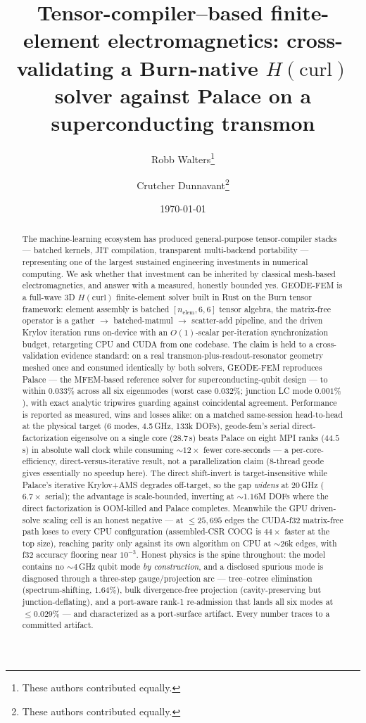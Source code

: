\documentclass{anvil-paper}
\title{Tensor-compiler--based finite-element electromagnetics:
cross-validating a Burn-native $H(\mathrm{curl})$ solver against Palace on
a superconducting transmon}
\author{Robb Walters\thanks{These authors contributed equally.}
  \and Crutcher Dunnavant\thanks{These authors contributed equally.}}
\date{\today}
\begin{document}
\maketitle

\begin{abstract}
The machine-learning ecosystem has produced general-purpose tensor-compiler
stacks --- batched kernels, JIT compilation, transparent multi-backend
portability --- representing one of the largest sustained engineering
investments in numerical computing. We ask whether that investment can be
inherited by classical mesh-based electromagnetics, and answer with a
measured, honestly bounded yes. GEODE-FEM is a full-wave 3D
$H(\mathrm{curl})$ finite-element solver built in Rust on the Burn tensor
framework: element assembly is batched $[n_{\mathrm{elem}},6,6]$ tensor
algebra, the matrix-free operator is a gather $\to$ batched-matmul $\to$
scatter-add pipeline, and the driven Krylov iteration runs on-device with an
$O(1)$-scalar per-iteration synchronization budget, retargeting CPU and CUDA
from one codebase. The claim is held to a cross-validation evidence
standard: on a real transmon-plus-readout-resonator geometry meshed once and
consumed identically by both solvers, GEODE-FEM reproduces Palace --- the
MFEM-based reference solver for superconducting-qubit design --- to within
$0.033\%$ across all six eigenmodes (worst case $0.032\%$; junction LC mode
$0.001\%$), with exact analytic tripwires guarding against coincidental
agreement. Performance is reported as measured, wins and losses alike: on a
matched same-session head-to-head at the physical target (6 modes,
4.5\,GHz, 133k DOFs), geode-fem's serial direct-factorization eigensolve
on a single core ($28.7$\,s) beats Palace on eight MPI ranks ($44.5$\,s)
in absolute wall clock while consuming ${\sim}12\times$ fewer core-seconds
--- a per-core-efficiency, direct-versus-iterative result, not a
parallelization claim (8-thread geode gives essentially no speedup here).
The direct shift-invert is target-insensitive while Palace's iterative
Krylov+AMS degrades off-target, so the gap \emph{widens} at 20\,GHz
($6.7\times$ serial); the advantage is scale-bounded, inverting at
${\sim}1.16$M DOFs where the direct factorization is OOM-killed and Palace
completes. Meanwhile the GPU driven-solve scaling
cell is an honest negative --- at $\leq 25{,}695$ edges the CUDA-f32
matrix-free path loses to every CPU configuration (assembled-CSR COCG is
$44\times$ faster at the top size), reaching parity only against its own
algorithm on CPU at ${\sim}26$k edges, with f32 accuracy flooring near
$10^{-3}$. Honest physics is the spine throughout: the model contains no
${\sim}4$\,GHz qubit mode \emph{by construction}, and a disclosed spurious
mode is diagnosed through a three-step gauge/projection arc --- tree--cotree
elimination (spectrum-shifting, $1.64\%$), bulk divergence-free projection
(cavity-preserving but junction-deflating), and a port-aware rank-1
re-admission that lands all six modes at $\leq 0.029\%$ --- and characterized
as a port-surface artifact. Every number traces to a committed artifact.
\end{abstract}
\end{document}
